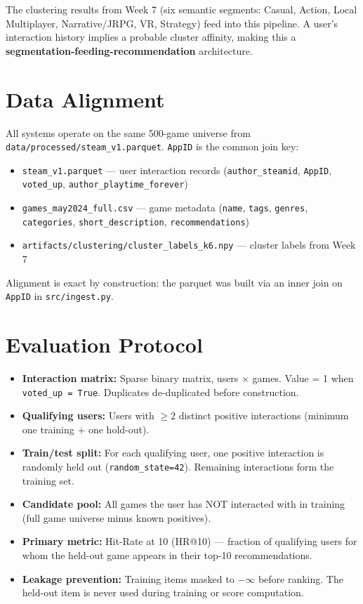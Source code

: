 \documentclass[11pt,a4paper]{article}
\begin{document}
The clustering results from Week 7 (six semantic segments: Casual, Action, Local Multiplayer, Narrative/JRPG, VR, Strategy) feed into this pipeline. A user's interaction history implies a probable cluster affinity, making this a \textbf{segmentation-feeding-recommendation} architecture.

\section{Data Alignment}

All systems operate on the same 500-game universe from \texttt{data/processed/steam\_v1.parquet}. \texttt{AppID} is the common join key:

\begin{itemize}[leftmargin=*]
  \item \texttt{steam\_v1.parquet} --- user interaction records (\texttt{author\_steamid}, \texttt{AppID}, \texttt{voted\_up}, \texttt{author\_playtime\_forever})
  \item \texttt{games\_may2024\_full.csv} --- game metadata (\texttt{name}, \texttt{tags}, \texttt{genres}, \texttt{categories}, \texttt{short\_description}, \texttt{recommendations})
  \item \texttt{artifacts/clustering/cluster\_labels\_k6.npy} --- cluster labels from Week 7
\end{itemize}

Alignment is exact by construction: the parquet was built via an inner join on \texttt{AppID} in \texttt{src/ingest.py}.

\section{Evaluation Protocol}

\begin{itemize}[leftmargin=*]
  \item \textbf{Interaction matrix:} Sparse binary matrix, users $\times$ games. Value = 1 when \texttt{voted\_up = True}. Duplicates de-duplicated before construction.
  \item \textbf{Qualifying users:} Users with $\geq 2$ distinct positive interactions (minimum one training + one hold-out).
  \item \textbf{Train/test split:} For each qualifying user, one positive interaction is randomly held out (\texttt{random\_state=42}). Remaining interactions form the training set.
  \item \textbf{Candidate pool:} All games the user has NOT interacted with in training (full game universe minus known positives).
  \item \textbf{Primary metric:} Hit-Rate at 10 (HR@10) --- fraction of qualifying users for whom the held-out game appears in their top-10 recommendations.
  \item \textbf{Leakage prevention:} Training items masked to $-\infty$ before ranking. The held-out item is never used during training or score computation.
\end{itemize}
\end{document}
